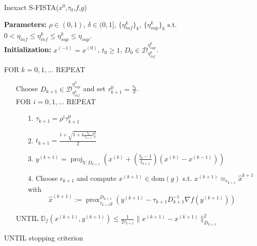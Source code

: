 \documentclass[conference]{IEEEtran}
\begin{document}
\begin{algorithm}[h]
\caption{Inexact S-FISTA($x^0$,$\tau_0$,$f$,$g$)}
\label{alg:S-FISTA}
\small{
\textbf{Parameters:} $\rho\in(0,1)$, $\delta\in(0,1]$, $\{\eta_{inf}^k\}_k$, $\{\eta_{sup}^k\}_k$ s.t. $0<\eta_{inf}\leq\eta_{inf}^k\leq \eta_{sup}^k\leq \eta_{sup}$.\\
\textbf{Initialization:} $x^{(-1)}=x^{(0)}$, $t_0\geq 1$,  $D_0\in\mathcal{D}_{\eta_{inf}^0}^{\eta_{sup}^0}$.

{\textsc{FOR $k=0,1,\ldots$ REPEAT}}
\begin{itemize}
    \item[] Choose $D_{k+1}\in\mathcal{D}_{\eta_{inf}^k}^{\eta_{sup}^k}$ and set $\tau_{k+1}^0=\frac{\tau_k}{\delta}$.\\
    {\textsc{FOR $i=0,1,\ldots $ REPEAT}}
    \begin{itemize}[leftmargin=1cm]

 \item[\textsc{1.}] $\tau_{k+1}=\rho^i \tau_{k+1}^0$
        \item[\textsc{2.}]  $t_{k+1}=\frac{1+\sqrt{1+4\frac{\tau_k}{\tau_{k+1}}t_k^2}}{2}$
        \item[\textsc{3.}] $y^{(k+1)}=\operatorname{proj}_{Y,D_{k+1}}\left(x^{(k)}+\left(\frac{t_k-1}{t_{k+1}}\right)(x^{(k)}-x^{(k-1)})\right)$
        \item[\textsc{4.}] Choose ${\epsilon}_{k+1}$ and compute $x^{(k+1)}\in\text{dom}(g)$ s.t. $x^{(k+1)}\approx_{\epsilon_{k+1}} \hat{x}^{k+1}$ with
\begin{equation*}
            \hat{x}^{(k+1)}:=\operatorname{prox}_{\tau_{k+1}g}^{D_{k+1}}(y^{(k+1)}-\tau_{k+1}D_{k+1}^{-1}\nabla f(y^{(k+1)}))
\end{equation*}
\normalsize
    \end{itemize}
    {\textsc{UNTIL}}
    $\mathbb{D}_f(x^{(k+1)},y^{(k+1)}) \leq\frac{1}{2\tau_{k+1}}\|x^{(k+1)}-x^{(k+1)}\|^2_{D_{k+1}}$
\end{itemize} 

{\textsc{UNTIL}} stopping criterion
}
\normalsize
\end{algorithm}
\end{document}
